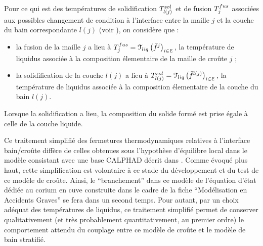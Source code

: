 Pour ce qui est des températures de solidification $\temperature[sol]{l(j)}$ et de fusion $\temperature[fus]{j}$ associées aux possibles changement de condition à l'interface entre la maille $j$ et la couche du bain correspondante $l(j)$ (voir ), on considère que :
\begin{itemize}
 \item la fusion de la maille $j$ a lieu à $\temperature[fus]{j}=\Mc{T}_{liq}\left(\elementMassFraction[j]{}\right)_{i\in\elementSet}$, la température de liquidus associée à la composition élementaire de la maille de croûte $j$ ;
 \item la solidification de la couche $l(j)$ a lieu à $\temperature[sol]{l(j)}=\Mc{T}_{liq}\left(\elementMassFraction[l(j)]{}\right)_{i\in\elementSet}$, la température de liquidus associée à la composition élementaire de la couche du bain $l(j)$.
\end{itemize}
Lorsque la solidification a lieu, la composition du solide formé est prise égale à celle de la couche liquide. 

Ce traitement simplifié des fermetures thermodynamiques relatives à l'interface bain/croûte diffère de celles obtenues sous l'hypothèse d'équilibre local dans le modèle consistant avec une base CALPHAD décrit dans \cite{Tiwari2018}. Comme évoqué plus haut, cette simplification est volontaire à ce stade du développement et du test de ce modèle de croûte. Ainsi, le ``branchement'' dans ce modèle de l'équation d'état dédiée au corium en cuve construite dans le cadre de la fiche ``Modélisation en Accidents Graves'' se fera dans un second temps. Pour autant, par un choix adéquat des températures de liquidus, ce traitement simplifié permet de conserver qualitativement (et très probablement quantitativement, au premier ordre) le comportement attendu du couplage entre ce modèle de croûte et le modèle de bain stratifié.

